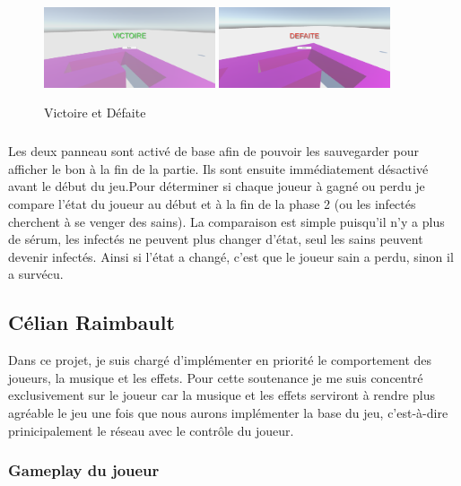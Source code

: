 \documentclass{article}
\begin{document}
\par\vspace{0.5cm}
\begin{figure}[!h]
    \centering
    \includegraphics[width=0.45\textwidth]{Victoire.PNG}
    \includegraphics[width=0.45\textwidth]{Defaite.PNG}
    \caption{Victoire et Défaite}
    \label{Ecran de fin}
\end{figure}{}

\subparagraph{}
Les deux panneau sont activé de base afin de pouvoir les sauvegarder pour afficher le bon à la fin de la partie. Ils sont ensuite immédiatement désactivé avant le début du jeu.Pour déterminer si chaque joueur à gagné ou perdu je compare l'état du joueur au début et à la fin de la phase 2 (ou les infectés cherchent à se venger des sains). La comparaison est simple puisqu'il n'y a plus de sérum, les infectés ne peuvent plus changer d'état, seul les sains peuvent devenir infectés. Ainsi si l'état a changé, c'est que le joueur sain a perdu, sinon il a survécu.

\newpage
\subsection{Célian Raimbault}

Dans ce projet, je suis chargé d'implémenter en priorité le comportement des joueurs, la musique et les effets. Pour cette soutenance je me suis concentré exclusivement sur le joueur car la musique et les effets serviront à rendre plus agréable le jeu une fois que nous aurons implémenter la base du jeu, c'est-à-dire prinicipalement le réseau avec le contrôle du joueur.

\subsubsection{Gameplay du joueur}
\end{document}
